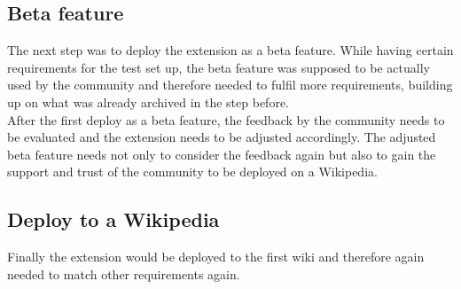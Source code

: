 \documentclass[11pt]{article}
\begin{document}
\subsection{Beta feature}
The next step was to deploy the extension as a beta feature. While having certain requirements for the test set up, the beta feature was supposed to be actually used by the community and therefore needed to fulfil more requirements, building up on what was already archived in the step before. \\
After the first deploy as a beta feature, the feedback by the community needs to be evaluated and the extension needs to be adjusted accordingly. The adjusted beta feature needs not only to consider the feedback again but also to gain the support and trust of the community to be deployed on a Wikipedia.

\subsection{Deploy to a Wikipedia}
Finally the extension would be deployed to the first wiki and therefore again needed to match other requirements again. 


 
\end{document}
